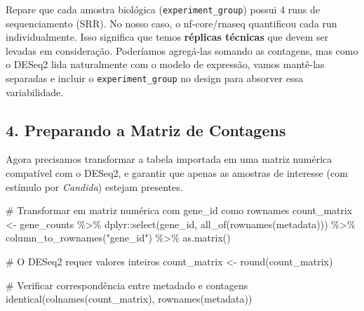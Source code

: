 \documentclass[
  letterpaper,
  DIV=11,
  numbers=noendperiod]{scrreprt}
\newenvironment{Shaded}{\begin{snugshade}}{\end{snugshade}}
\newcommand{\CommentTok}[1]{\textcolor[rgb]{0.37,0.37,0.37}{#1}}
\newcommand{\FunctionTok}[1]{\textcolor[rgb]{0.28,0.35,0.67}{#1}}
\newcommand{\NormalTok}[1]{\textcolor[rgb]{0.00,0.23,0.31}{#1}}
\newcommand{\OtherTok}[1]{\textcolor[rgb]{0.00,0.23,0.31}{#1}}
\newcommand{\SpecialCharTok}[1]{\textcolor[rgb]{0.37,0.37,0.37}{#1}}
\newcommand{\StringTok}[1]{\textcolor[rgb]{0.13,0.47,0.30}{#1}}
\begin{document}
\begin{tcolorbox}[enhanced jigsaw, arc=.35mm, colframe=quarto-callout-note-color-frame, breakable, bottomrule=.15mm, colback=white, left=2mm, titlerule=0mm, opacityback=0, title=\textcolor{quarto-callout-note-color}{\faInfo}\hspace{0.5em}{Ponto Importante}, leftrule=.75mm, colbacktitle=quarto-callout-note-color!10!white, bottomtitle=1mm, toprule=.15mm, toptitle=1mm, rightrule=.15mm, opacitybacktitle=0.6, coltitle=black]

Repare que cada amostra biológica (\texttt{experiment\_group}) possui 4
runs de sequenciamento (SRR). No nosso caso, o nf-core/rnaseq
quantificou cada run individualmente. Isso significa que temos
\textbf{réplicas técnicas} que devem ser levadas em consideração.
Poderíamos agregá-las somando as contagens, mas como o DESeq2 lida
naturalmente com o modelo de expressão, vamos mantê-las separadas e
incluir o \texttt{experiment\_group} no design para absorver essa
variabilidade.

\end{tcolorbox}

\subsection{4. Preparando a Matriz de
Contagens}\label{preparando-a-matriz-de-contagens}

Agora precisamos transformar a tabela importada em uma matriz numérica
compatível com o DESeq2, e garantir que apenas as amostras de interesse
(com estímulo por \emph{Candida}) estejam presentes.

\begin{Shaded}
\begin{Highlighting}[]
\CommentTok{\# Transformar em matriz numérica com gene\_id como rownames}
\NormalTok{count\_matrix }\OtherTok{\textless{}{-}}\NormalTok{ gene\_counts }\SpecialCharTok{\%\textgreater{}\%}
\NormalTok{  dplyr}\SpecialCharTok{::}\FunctionTok{select}\NormalTok{(gene\_id, }\FunctionTok{all\_of}\NormalTok{(}\FunctionTok{rownames}\NormalTok{(metadata))) }\SpecialCharTok{\%\textgreater{}\%}
  \FunctionTok{column\_to\_rownames}\NormalTok{(}\StringTok{"gene\_id"}\NormalTok{) }\SpecialCharTok{\%\textgreater{}\%}
  \FunctionTok{as.matrix}\NormalTok{()}

\CommentTok{\# O DESeq2 requer valores inteiros}
\NormalTok{count\_matrix }\OtherTok{\textless{}{-}} \FunctionTok{round}\NormalTok{(count\_matrix)}

\CommentTok{\# Verificar correspondência entre metadado e contagens}
\FunctionTok{identical}\NormalTok{(}\FunctionTok{colnames}\NormalTok{(count\_matrix), }\FunctionTok{rownames}\NormalTok{(metadata))}
\end{Highlighting}
\end{Shaded}
\end{document}
